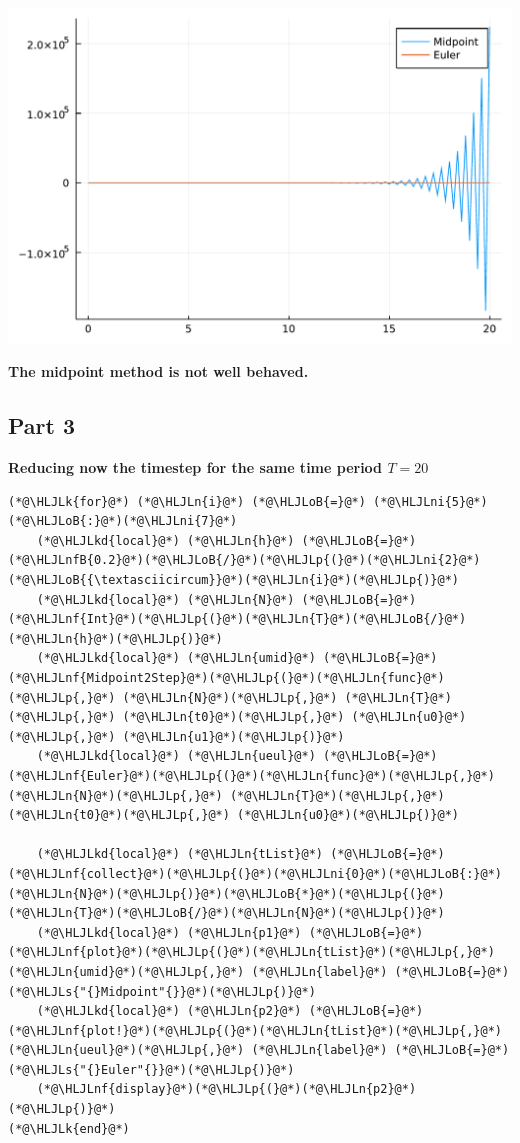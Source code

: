 \documentclass[12pt,a4paper]{article}
\newcommand{\HLJLk}[1]{\textcolor[RGB]{148,91,176}{\textbf{#1}}}
\newcommand{\HLJLkd}[1]{\textcolor[RGB]{214,102,97}{\textit{#1}}}
\newcommand{\HLJLn}[1]{#1}
\newcommand{\HLJLnf}[1]{\textcolor[RGB]{66,102,213}{#1}}
\newcommand{\HLJLs}[1]{\textcolor[RGB]{201,61,57}{#1}}
\newcommand{\HLJLnfB}[1]{\textcolor[RGB]{59,151,46}{#1}}
\newcommand{\HLJLni}[1]{\textcolor[RGB]{59,151,46}{#1}}
\newcommand{\HLJLoB}[1]{\textcolor[RGB]{102,102,102}{\textbf{#1}}}
\newcommand{\HLJLp}[1]{#1}
\begin{document}
\includegraphics[width=\linewidth]{figures/ass_1_report_12_1.pdf}

\textbf{The midpoint method is not well behaved.}

\subsection{Part 3}
\textbf{Reducing now the timestep for the same time period $T=20$}


\begin{lstlisting}
(*@\HLJLk{for}@*) (*@\HLJLn{i}@*) (*@\HLJLoB{=}@*) (*@\HLJLni{5}@*)(*@\HLJLoB{:}@*)(*@\HLJLni{7}@*)
    (*@\HLJLkd{local}@*) (*@\HLJLn{h}@*) (*@\HLJLoB{=}@*) (*@\HLJLnfB{0.2}@*)(*@\HLJLoB{/}@*)(*@\HLJLp{(}@*)(*@\HLJLni{2}@*)(*@\HLJLoB{{\textasciicircum}}@*)(*@\HLJLn{i}@*)(*@\HLJLp{)}@*)
    (*@\HLJLkd{local}@*) (*@\HLJLn{N}@*) (*@\HLJLoB{=}@*) (*@\HLJLnf{Int}@*)(*@\HLJLp{(}@*)(*@\HLJLn{T}@*)(*@\HLJLoB{/}@*)(*@\HLJLn{h}@*)(*@\HLJLp{)}@*)
    (*@\HLJLkd{local}@*) (*@\HLJLn{umid}@*) (*@\HLJLoB{=}@*) (*@\HLJLnf{Midpoint2Step}@*)(*@\HLJLp{(}@*)(*@\HLJLn{func}@*)(*@\HLJLp{,}@*) (*@\HLJLn{N}@*)(*@\HLJLp{,}@*) (*@\HLJLn{T}@*)(*@\HLJLp{,}@*) (*@\HLJLn{t0}@*)(*@\HLJLp{,}@*) (*@\HLJLn{u0}@*)(*@\HLJLp{,}@*) (*@\HLJLn{u1}@*)(*@\HLJLp{)}@*)
    (*@\HLJLkd{local}@*) (*@\HLJLn{ueul}@*) (*@\HLJLoB{=}@*) (*@\HLJLnf{Euler}@*)(*@\HLJLp{(}@*)(*@\HLJLn{func}@*)(*@\HLJLp{,}@*) (*@\HLJLn{N}@*)(*@\HLJLp{,}@*) (*@\HLJLn{T}@*)(*@\HLJLp{,}@*) (*@\HLJLn{t0}@*)(*@\HLJLp{,}@*) (*@\HLJLn{u0}@*)(*@\HLJLp{)}@*)

    (*@\HLJLkd{local}@*) (*@\HLJLn{tList}@*) (*@\HLJLoB{=}@*) (*@\HLJLnf{collect}@*)(*@\HLJLp{(}@*)(*@\HLJLni{0}@*)(*@\HLJLoB{:}@*)(*@\HLJLn{N}@*)(*@\HLJLp{)}@*)(*@\HLJLoB{*}@*)(*@\HLJLp{(}@*)(*@\HLJLn{T}@*)(*@\HLJLoB{/}@*)(*@\HLJLn{N}@*)(*@\HLJLp{)}@*)
    (*@\HLJLkd{local}@*) (*@\HLJLn{p1}@*) (*@\HLJLoB{=}@*) (*@\HLJLnf{plot}@*)(*@\HLJLp{(}@*)(*@\HLJLn{tList}@*)(*@\HLJLp{,}@*)(*@\HLJLn{umid}@*)(*@\HLJLp{,}@*) (*@\HLJLn{label}@*) (*@\HLJLoB{=}@*) (*@\HLJLs{"{}Midpoint"{}}@*)(*@\HLJLp{)}@*)
    (*@\HLJLkd{local}@*) (*@\HLJLn{p2}@*) (*@\HLJLoB{=}@*) (*@\HLJLnf{plot!}@*)(*@\HLJLp{(}@*)(*@\HLJLn{tList}@*)(*@\HLJLp{,}@*)(*@\HLJLn{ueul}@*)(*@\HLJLp{,}@*) (*@\HLJLn{label}@*) (*@\HLJLoB{=}@*) (*@\HLJLs{"{}Euler"{}}@*)(*@\HLJLp{)}@*)
    (*@\HLJLnf{display}@*)(*@\HLJLp{(}@*)(*@\HLJLn{p2}@*)(*@\HLJLp{)}@*)
(*@\HLJLk{end}@*)
\end{lstlisting}
\end{document}

